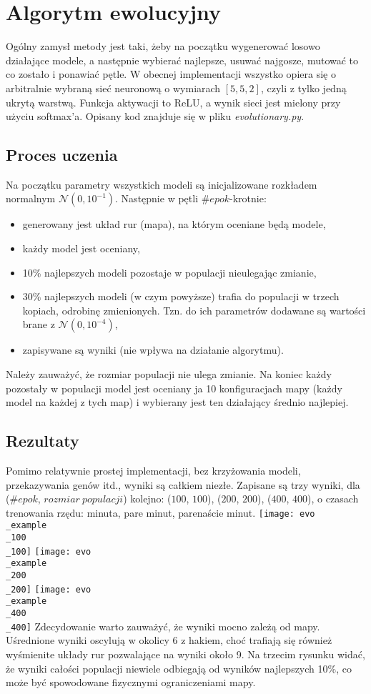 \documentclass[12pt, A4]{article}
\begin{document}
\section{Algorytm ewolucyjny}
Ogólny zamysł metody jest taki, żeby na początku wygenerować losowo działające modele, a następnie wybierać najlepsze, usuwać najgosze, mutować to co zostało i ponawiać pętle.
\newline
W obecnej implementacji wszystko opiera się o arbitralnie wybraną sieć neuronową o wymiarach $[5, 5, 2]$, czyli z tylko jedną ukrytą warstwą. Funkcja aktywacji to ReLU, a wynik sieci jest mielony przy użyciu softmax'a. Opisany kod znajduje się w pliku \textit{evolutionary.py}.

\subsection{Proces uczenia}
Na początku parametry wszystkich modeli są inicjalizowane rozkładem normalnym $\mathcal{N}(0, 10^{-1})$.
Następnie w pętli $\#epok$-krotnie:
\begin{itemize}
	\item generowany jest układ rur (mapa), na którym oceniane będą modele,
	\item każdy model jest oceniany,
	\item 10\% najlepszych modeli pozostaje w populacji nieulegając zmianie,
	\item 30\% najlepszych modeli (w czym powyższe) trafia do populacji w trzech kopiach, odrobinę zmienionych. Tzn. do ich parametrów dodawane są wartości brane z $\mathcal{N}(0, 10^{-4})$,
	\item zapisywane są wyniki (nie wpływa na działanie algorytmu).
\end{itemize}
Należy zauważyć, że rozmiar populacji nie ulega zmianie.
\newline
Na koniec każdy pozostały w populacji model jest oceniany ja 10 konfiguracjach mapy (każdy model na każdej z tych map) i wybierany jest ten działający średnio najlepiej.

\subsection{Rezultaty}
Pomimo relatywnie prostej implementacji, bez krzyżowania modeli, przekazywania genów itd., wyniki są całkiem niezłe. Zapisane są trzy wyniki, dla ($\#epok$, $rozmiar \ populacji$) kolejno: ($100$, $100$), ($200$, $200$), ($400$, $400$), o czasach trenowania rzędu: minuta, pare minut, parenaście minut.
\newline
\texttt{[image: evo\\\_example\\\_100\\\_100]}
\texttt{[image: evo\\\_example\\\_200\\\_200]}
\newline
\texttt{[image: evo\\\_example\\\_400\\\_400]}
\newline
Zdecydowanie warto zauważyć, że wyniki mocno zależą od mapy. Uśrednione wyniki oscylują w okolicy 6 z hakiem, choć trafiają się również wyśmienite układy rur pozwalające na wyniki około 9.
\newline
Na trzecim rysunku widać, że wyniki całości populacji niewiele odbiegają od wyników najlepszych 10\%, co może być spowodowane fizycznymi ograniczeniami mapy.
\end{document}
